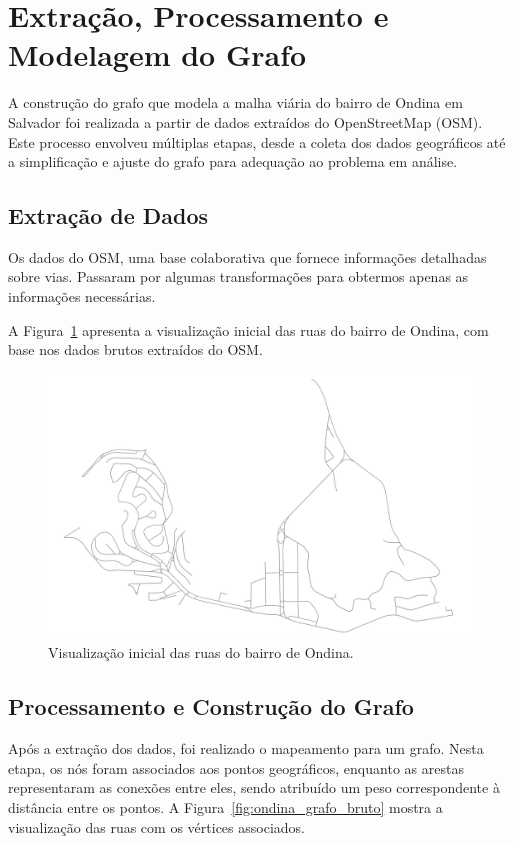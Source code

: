 \documentclass[12pt, a4paper]{report}
\begin{document}
\section{Extração, Processamento e Modelagem do Grafo}

A construção do grafo que modela a malha viária do bairro de Ondina em Salvador foi realizada a partir de dados extraídos do OpenStreetMap (OSM). Este processo envolveu múltiplas etapas, desde a coleta dos dados geográficos até a simplificação e ajuste do grafo para adequação ao problema em análise.

\subsection{Extração de Dados}

Os dados do OSM, uma base colaborativa que fornece informações detalhadas sobre vias. Passaram por algumas transformações para obtermos apenas as informações necessárias.

A Figura~\ref{fig:ondina_ruas} apresenta a visualização inicial das ruas do bairro de Ondina, com base nos dados brutos extraídos do OSM.

\begin{figure}[H]
    \centering
    \includegraphics[width=\textwidth]{visualizacao_inicial}
    \caption{Visualização inicial das ruas do bairro de Ondina.}
    \label{fig:ondina_ruas}
\end{figure}

\subsection{Processamento e Construção do Grafo}

Após a extração dos dados, foi realizado o mapeamento para um grafo. Nesta etapa, os nós foram associados aos pontos geográficos, enquanto as arestas representaram as conexões entre eles, sendo atribuído um peso correspondente à distância entre os pontos. A Figura~\ref{fig:ondina_grafo_bruto} mostra a visualização das ruas com os vértices associados.
\end{document}
